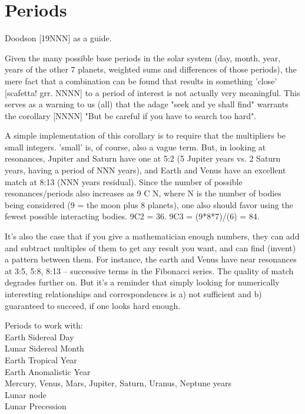 

\section{Periods}
Doodson [19NNN] as a guide.

Given the many possible base periods in the solar system (day, month, year, years of the other 7 planets, weighted sums and differences of those periods), the mere fact that a combination can be found that results in something 'close' [scafetta! grr. NNNN] to a period of interest is not actually very meaningful. This serves as a warning to us (all) that the adage "seek and ye shall find" warrants the corollary [NNNN] "But be careful if you have to search too hard".

A simple implementation of this corollary is to require that the multipliers be small integers. 'small' is, of course, also a vague term. But, in looking at resonances, Jupiter and Saturn have one at 5:2 (5 Jupiter years vs. 2 Saturn years, having a period of NNN years), and Earth and Venus have an excellent match at 8:13 (NNN years residual). Since the number of possible resonances/periods also increases as 9 C N, where N is the number of bodies being considered (9 = the moon plus 8 planets), one also should favor using the fewest possible interacting bodies. 9C2 = 36. 9C3 = (9*8*7)/(6) = 84.

It's also the case that if you give a mathematician enough numbers, they can add and subtract multiples of them to get any result you want, and can find (invent)  a pattern between them. For instance, the earth and Venus have near resonances at 3:5, 5:8, 8:13 -- successive terms in the Fibonacci series. The quality of match degrades further on. But it's a reminder that simply looking for numerically interesting relationships and correspondences is a) not sufficient and b) guaranteed to succeed, if one looks hard enough.

Periods to work with:\\
Earth Sidereal Day\\
Lunar Sidereal Month\\
Earth Tropical Year\\
Earth Anomalistic Year\\
Mercury, Venus, Mars, Jupiter, Saturn, Uranus, Neptune years\\
Lunar node\\
Lunar Precession\\

